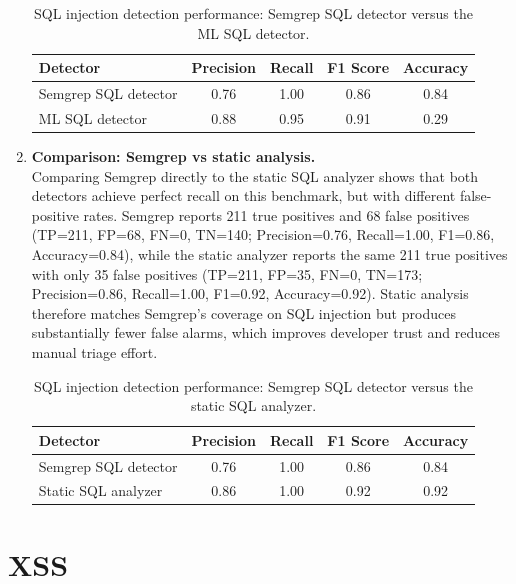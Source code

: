 \begin{enumerate}
  \begin{table}[htbp]
    \centering
    \small
    \begin{tabular}{lcccc}
      \textbf{Detector} & \textbf{Precision} & \textbf{Recall} & \textbf{F1 Score} & \textbf{Accuracy} \\
      \hline
      Semgrep SQL detector & 0.76 & 1.00 & 0.86 & 0.84 \\
      ML SQL detector & 0.88 & 0.95 & 0.91 & 0.29 \\
    \end{tabular}
    \caption{SQL injection detection performance: Semgrep SQL detector versus the ML SQL detector.}
    \label{tab:sql_semgrep_vs_ml}
  \end{table}

  \item \textbf{Comparison: Semgrep vs static analysis.}\\
  Comparing Semgrep directly to the static SQL analyzer shows that both detectors achieve
  perfect recall on this benchmark, but with different false-positive rates. Semgrep
  reports 211 true positives and 68 false positives (TP=211, FP=68, FN=0, TN=140;
  Precision=0.76, Recall=1.00, F1=0.86, Accuracy=0.84), while the static analyzer reports
  the same 211 true positives with only 35 false positives (TP=211, FP=35, FN=0, TN=173;
  Precision=0.86, Recall=1.00, F1=0.92, Accuracy=0.92). Static analysis therefore matches
  Semgrep's coverage on SQL injection but produces substantially fewer false alarms,
  which improves developer trust and reduces manual triage effort.

  \begin{table}[htbp]
    \centering
    \small
    \begin{tabular}{lcccc}
      \textbf{Detector} & \textbf{Precision} & \textbf{Recall} & \textbf{F1 Score} & \textbf{Accuracy} \\
      \hline
      Semgrep SQL detector & 0.76 & 1.00 & 0.86 & 0.84 \\
      Static SQL analyzer & 0.86 & 1.00 & 0.92 & 0.92 \\
    \end{tabular}
    \caption{SQL injection detection performance: Semgrep SQL detector versus the static SQL analyzer.}
    \label{tab:sql_semgrep_vs_static}
  \end{table}
\end{enumerate}

\section{XSS}
\label{sec:results_xss}

